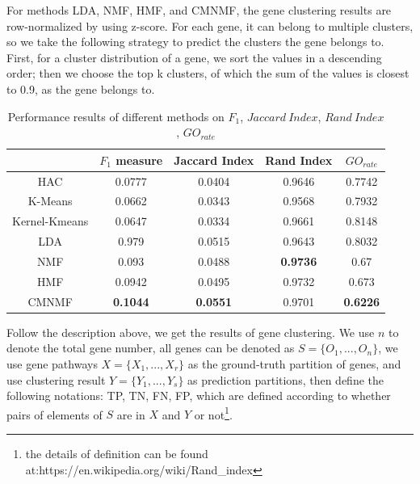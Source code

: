 \documentclass{bmcart}
\begin{document}
For methods LDA, NMF, HMF, and CMNMF, the gene clustering results are row-normalized by using z-score. For each gene, it can belong to multiple clusters, so we take the following strategy to predict the clusters the gene belongs to. First, for a cluster distribution of a gene, we sort the values in a descending order; then we choose the top k clusters, of which the sum of the values is closest to 0.9, as the gene belongs to.
\begin{table}[!t]
\centering
\caption{Performance results of different methods on $F_1$, $Jaccard\ Index$, $Rand\ Index$, $GO_{rate}$}\label{tab:measurements}
\begin{tabular}{|c||c|c|c|c|}
\hline
&$F_1$ measure &Jaccard Index& Rand Index&$GO_{rate}$\\
\hline
\hline
HAC&0.0777&0.0404&0.9646&0.7742\\
\hline
K-Means&0.0662  & 0.0343&0.9568& 0.7932\\
\hline
Kernel-Kmeans&0.0647&0.0334&0.9661&0.8148\\
\hline
LDA&0.979&0.0515&0.9643&0.8032\\
\hline
NMF&0.093&0.0488&\textbf{0.9736}&0.67\\
\hline
HMF&0.0942&0.0495&0.9732&0.673\\
\hline
CMNMF&\textbf{0.1044}& \textbf{0.0551}&{0.9701}& \textbf{0.6226}\\
\hline
\end{tabular}
\end{table}
Follow the description above, we get the results of gene clustering. We use $n$ to denote the total gene number, all genes can be denoted as $S=\{O_1,...,O_n\}$, we use gene pathways $X=\{X_1,...,X_r\}$ as the ground-truth partition of genes, and use clustering result $Y=\{Y_1,...,Y_s\}$ as prediction partitions, then define the following notations: TP, TN, FN, FP, which are defined according to whether pairs of elements of $S$ are in $X$ and $Y$ or not\footnote{the details of definition can be found at:https://en.wikipedia.org/wiki/Rand\_index}.
\end{document}
